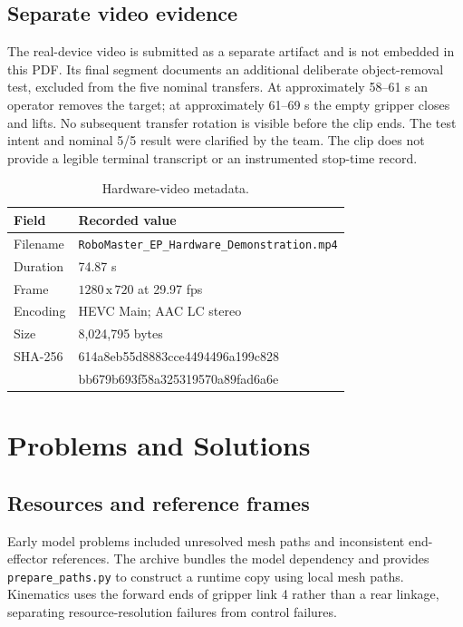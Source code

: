 \documentclass[9pt,a4paper,twocolumn,twoside]{tau-class/tau}
\newcommand{\codepath}[1]{{\small\ttfamily\nolinkurl{#1}}}
\begin{document}
\subsection{Separate video evidence}
The real-device video is submitted as a separate artifact and is not embedded in
this PDF. Its final segment documents an additional deliberate object-removal
test, excluded from the five nominal transfers. At approximately 58--61 s an
operator removes the target; at approximately 61--69 s the empty gripper closes
and lifts. No subsequent transfer rotation is visible before the clip ends.
The test intent and nominal 5/5 result were clarified by the team. The clip does
not provide a legible terminal transcript or an instrumented stop-time record.

\begin{table}[H]
\caption{Hardware-video metadata.}
\label{tab:video}
\begin{tabularx}{\columnwidth}{@{}p{22mm}Y@{}}
\toprule
\textbf{Field} & \textbf{Recorded value}\\
\midrule
Filename & \codepath{RoboMaster_EP_Hardware_Demonstration.mp4}\\
Duration & 74.87 s\\
Frame & $1280\,\mathrm{x}\,720$ at 29.97 fps\\
Encoding & HEVC Main; AAC LC stereo\\
Size & 8,024,795 bytes\\
SHA-256 & \scriptsize\ttfamily 614a8eb55d8883cce4494496a199c828\\
& \scriptsize\ttfamily bb679b693f58a325319570a89fad6a6e\\
\bottomrule
\end{tabularx}
\end{table}

\section{Problems and Solutions}

\subsection{Resources and reference frames}
Early model problems included unresolved mesh paths and inconsistent
end-effector references. The archive bundles the model dependency and provides
\codepath{prepare_paths.py} to construct a runtime copy using local mesh paths.
Kinematics uses the forward ends of gripper link 4 rather than a rear linkage,
separating resource-resolution failures from control failures.
\end{document}

